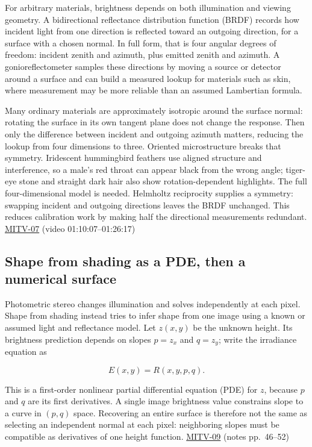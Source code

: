 For arbitrary materials, brightness depends on both illumination and viewing geometry. A bidirectional reflectance distribution function (BRDF) records how incident light from one direction is reflected toward an outgoing direction, for a surface with a chosen normal. In full form, that is four angular degrees of freedom: incident zenith and azimuth, plus emitted zenith and azimuth. A gonioreflectometer samples these directions by moving a source or detector around a surface and can build a measured lookup for materials such as skin, where measurement may be more reliable than an assumed Lambertian formula.

Many ordinary materials are approximately isotropic around the surface normal: rotating the surface in its own tangent plane does not change the response. Then only the difference between incident and outgoing azimuth matters, reducing the lookup from four dimensions to three. Oriented microstructure breaks that symmetry. Iridescent hummingbird feathers use aligned structure and interference, so a male's red throat can appear black from the wrong angle; tiger-eye stone and straight dark hair also show rotation-dependent highlights. The full four-dimensional model is needed. Helmholtz reciprocity supplies a symmetry: swapping incident and outgoing directions leaves the BRDF unchanged. This reduces calibration work by making half the directional measurements redundant. \hyperref[04-visual-computing-ii-ch036-mitv-07---gradient-space-reflectance-map-image-irradiance-equation-gnomonic-projection]{MITV-07} (video 01:10:07--01:26:17)

\subsection{Shape from shading as a PDE, then a numerical surface}\label{04-visual-computing-ii-ch032-shape-from-shading-as-a-pde-then-a-numerical-surface}

\hypertarget{04-visual-computing-ii-ch032-shape-from-shading-as-a-pde-then-a-numerical-surface}{}

Photometric stereo changes illumination and solves independently at each pixel. Shape from shading instead tries to infer shape from one image using a known or assumed light and reflectance model. Let \(z(x,y)\) be the unknown height. Its brightness prediction depends on slopes \(p=z_x\) and \(q=z_y\); write the irradiance equation as

\[
E(x,y)=R(x,y,p,q).
\]

This is a first-order nonlinear partial differential equation (PDE) for \(z\), because \(p\) and \(q\) are its first derivatives. A single image brightness value constrains slope to a curve in \((p,q)\) space. Recovering an entire surface is therefore not the same as selecting an independent normal at each pixel: neighboring slopes must be compatible as derivatives of one height function. \hyperref[04-visual-computing-ii-ch036-mitv-09---shape-from-shading-general-case---from-first-order-nonlinear-pde-to-five-odes]{MITV-09} (notes pp.~46--52)

